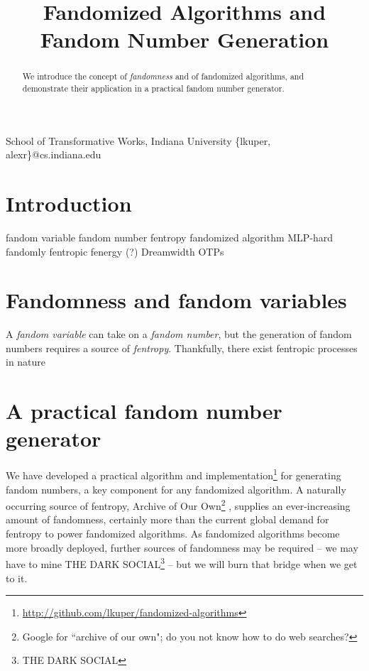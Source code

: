 \documentclass[9pt]{sigplanconf}
\begin{document}
\title{Fandomized Algorithms and Fandom Number Generation}

           {School of Transformative Works, Indiana University}
           {\{lkuper, alexr\}@cs.indiana.edu}

\maketitle

\begin{abstract}
We introduce the concept of \emph{fandomness} and of fandomized algorithms, and
demonstrate their application in a practical fandom number generator.
\end{abstract}

\section{Introduction}

fandom variable
fandom number
fentropy
fandomized algorithm
MLP-hard
fandomly
fentropic
fenergy (?)
Dreamwidth
OTPs

\section{Fandomness and fandom variables}

A \emph{fandom variable} can take on a \emph{fandom number}, but the
generation of fandom numbers requires a source of
\emph{fentropy}. Thankfully, there exist fentropic processes in nature

\section{A practical fandom number generator}
We have developed a practical algorithm and implementation\footnote{
\url{http://github.com/lkuper/fandomized-algorithms}} for
generating fandom numbers, a key component for any fandomized
algorithm. A naturally occurring source of fentropy, Archive of Our
Own\footnote{Google for ``archive of our own"; do you not know how to
  do web searches?\footnotemark}
, supplies an
ever-increasing amount of fandomness, certainly more than the current
global demand for fentropy to power fandomized algorithms. As
fandomized algorithms become more broadly deployed, further sources of
fandomness may be required -- we may have to mine THE DARK
SOCIAL\footnote{THE DARK SOCIAL} -- but we will burn that bridge when
we get to it.
\end{document}
